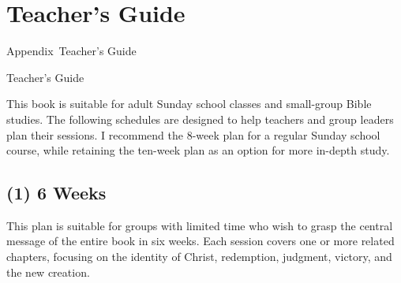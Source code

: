 \chapter*{Teacher's Guide} 
%
         {Appendix~\thechapter\quad Teacher's Guide}
 {\protect\numberline{\thechapter} Teacher's Guide}




This book is suitable for adult Sunday school classes and small-group Bible studies. The following schedules are designed to help teachers and group leaders plan their sessions. I recommend the 8-week plan for a regular Sunday school course, while retaining the ten-week plan as an option for more in-depth study.

\section*{(1) 6 Weeks}

This plan is suitable for groups with limited time who wish to grasp the central message of the entire book in six weeks. Each session covers one or more related chapters, focusing on the identity of Christ, redemption, judgment, victory, and the new creation.

